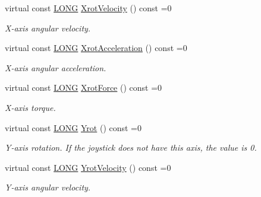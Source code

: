\begin{DoxyCompactItemize}
virtual const \hyperlink{_joypad_8h_a2a3e0cda5f1249bef6db47c5eb8e3813}{L\+O\+NG} \hyperlink{struct_x_input_joypad_ad6bcc1e11d6acbd06ebf5829be849eed}{Xrot\+Velocity} () const =0
\begin{DoxyCompactList}\small\item\em X-\/axis angular velocity. \end{DoxyCompactList}\item 
\mbox{\label{struct_x_input_joypad_a7e10a4c04604b17b8148e547625d840d}} 
virtual const \hyperlink{_joypad_8h_a2a3e0cda5f1249bef6db47c5eb8e3813}{L\+O\+NG} \hyperlink{struct_x_input_joypad_a7e10a4c04604b17b8148e547625d840d}{Xrot\+Acceleration} () const =0
\begin{DoxyCompactList}\small\item\em X-\/axis angular acceleration. \end{DoxyCompactList}\item 
\mbox{\label{struct_x_input_joypad_a4499b53bed5f47866f2afb7f8ff4fd90}} 
virtual const \hyperlink{_joypad_8h_a2a3e0cda5f1249bef6db47c5eb8e3813}{L\+O\+NG} \hyperlink{struct_x_input_joypad_a4499b53bed5f47866f2afb7f8ff4fd90}{Xrot\+Force} () const =0
\begin{DoxyCompactList}\small\item\em X-\/axis torque. \end{DoxyCompactList}\item 
\mbox{\label{struct_x_input_joypad_a20614fa56d86ebf80bd376e382da3967}} 
virtual const \hyperlink{_joypad_8h_a2a3e0cda5f1249bef6db47c5eb8e3813}{L\+O\+NG} \hyperlink{struct_x_input_joypad_a20614fa56d86ebf80bd376e382da3967}{Yrot} () const =0
\begin{DoxyCompactList}\small\item\em Y-\/axis rotation. If the joystick does not have this axis, the value is 0. \end{DoxyCompactList}\item 
\mbox{\label{struct_x_input_joypad_af59eac449d0f28bbe306d0a2ffbfa1d9}} 
virtual const \hyperlink{_joypad_8h_a2a3e0cda5f1249bef6db47c5eb8e3813}{L\+O\+NG} \hyperlink{struct_x_input_joypad_af59eac449d0f28bbe306d0a2ffbfa1d9}{Yrot\+Velocity} () const =0
\begin{DoxyCompactList}\small\item\em Y-\/axis angular velocity. \end{DoxyCompactList}\item 

\end{DoxyCompactItemize}
